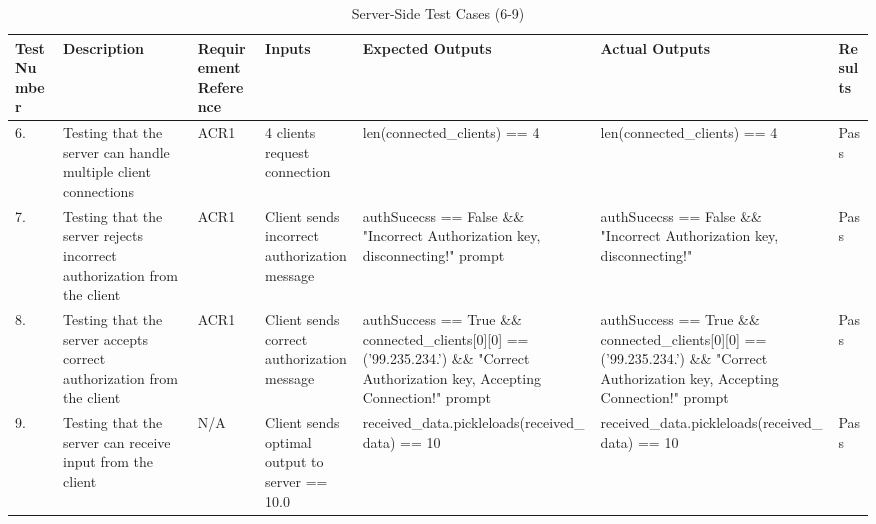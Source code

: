 \documentclass[12pt, titlepage]{article}
\begin{document}
\fancyhf{}
\fancyhead[C]{\thepage}
\renewcommand{\headrulewidth}{0pt}
\pagestyle{plain}

\begin{center}
    \begin{table}[H]
        \centering
        \begin{tabular}{|p{1cm}|p{2.2cm}|p{2.5cm}|p{2.7cm}|p{2.4cm}|p{2.4cm}|p{1.3cm}|}
        \hline
        \bf Test Number & \bf Description & \bf Requirement Reference & \bf Inputs & \bf Expected Outputs & \bf Actual Outputs & \bf Results \\
        \hline
        6. & Testing that the server can handle multiple client connections & ACR1 & 4  clients request connection & len(connected\newline\_clients) == 4 & len(connected\newline\_clients) == 4 & Pass\\
        \hline
        7. & Testing that the server rejects incorrect authorization from the client & ACR1 & Client sends incorrect authorization message & authSucecss == False \&\& "Incorrect Authorization key, disconnecting!" prompt & authSucecss == False \&\& "Incorrect Authorization key, disconnecting!" & Pass\\
        \hline
        8. & Testing that the server accepts correct authorization from the client & ACR1 & Client sends correct authorization message & authSuccess == True \&\& connected\newline \_clients[0][0] == ('99.235.234.\newline43') \&\& "Correct Authorization key, Accepting Connection!" prompt & authSuccess == True \&\& connected\newline\_clients[0][0] == ('99.235.234.\newline43') \&\& "Correct Authorization key, Accepting Connection!" prompt & Pass\\
        \hline
        9. & Testing that the server can receive input from the client & N/A & Client sends optimal output to server == 10.0 & received\_data.\newline pickleloads(re\newline ceived\_data) == 10 & received\_data.\newline pickleloads(re\newline ceived\_data) == 10 & Pass\\
        \hline
        \end{tabular}
        \caption{Server-Side Test Cases (6-9)}
        \label{tab:my_label4}
    \end{table}
\end{center}
\end{document}
